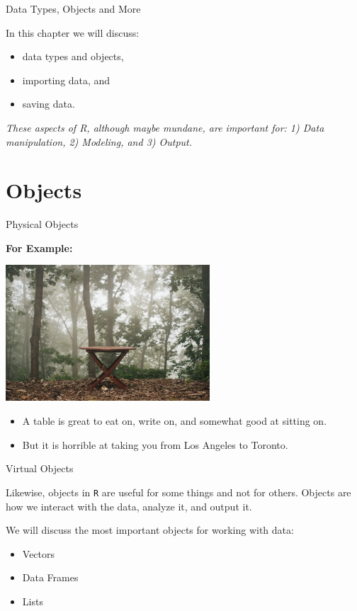 \documentclass[ignorenonframetext,]{beamer}
\providecommand{\tightlist}{%
\setlength{\itemsep}{0pt}\setlength{\parskip}{0pt}}
\begin{document}
\begin{frame}{Data Types, Objects and More}

In this chapter we will discuss:

\begin{itemize}[<+->]
\tightlist
\item
  data types and objects,
\item
  importing data, and
\item
  saving data.
\end{itemize}

\emph{These aspects of R, although maybe mundane, are important for: 1)
Data manipulation, 2) Modeling, and 3) Output.}

\end{frame}

\section{Objects}\label{objects}

\begin{frame}{Physical Objects}

\textbf{For Example:}

\vspace{6pt}\centerline{\includegraphics[height=2in]{Figures/table_forest.jpg}}

\begin{itemize}
\tightlist
\item
  A table is great to eat on, write on, and somewhat good at sitting on.
\item
  But it is horrible at taking you from Los Angeles to Toronto.
\end{itemize}

\end{frame}

\begin{frame}[fragile]{Virtual Objects}

Likewise, objects in \texttt{R} are useful for some things and not for
others. Objects are how we interact with the data, analyze it, and
output it.

We will discuss the most important objects for working with data:

\begin{itemize}[<+->]
\tightlist
\item
  Vectors
\item
  Data Frames
\item
  Lists
\end{itemize}

\end{frame}
\end{document}
